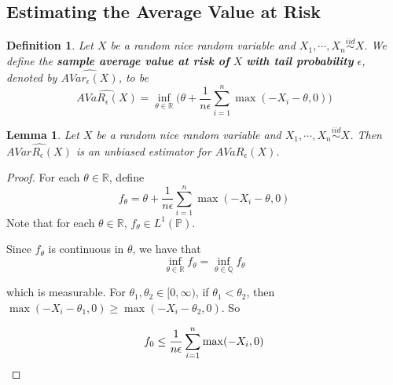 \documentclass[12pt]{amsart}
\newtheorem{lem}[thm]{Lemma}
\newtheorem{defn}[thm]{Definition}
\newcommand{\ep}{\epsilon}
\newcommand{\R}{\mathbb{R}}
\newcommand{\Q}{\mathbb{Q}}
\renewcommand{\P}{\mathbb{P}}
\newcommand{\Rg}{[0,\infty)}
\begin{document}
\subsection{Estimating the Average Value at Risk}

\begin{defn}
Let $X$ be a random nice random variable and $X_1, \cdots , X_n \stackrel{iid}{\sim} X$. We define the \textbf{sample average value at risk of }$X$ \textbf{with tail probability } $\ep$, denoted by $\widehat{AVar_{\ep}(X)}$, to be $$\widehat{AVaR_{\ep}(X)} = \inf_{\theta \in \R}\bigg(\theta + \frac{1}{n \ep} \sum_{i=1}^n\max(-X_i - \theta, 0) \bigg)$$ 
\end{defn}

\begin{lem}
Let $X$ be a random nice random variable and $X_1, \cdots , X_n \stackrel{iid}{\sim} X$. Then $\widehat{AVarR_{\ep}(X)}$ is an unbiased estimator for $AVaR_{\ep}(X)$. 
\end{lem}

\begin{proof}
For each $\theta \in \R$, define $$f_{\theta} = \theta + \frac{1}{n \ep} \sum_{i=1}^n\max(-X_i - \theta, 0) $$ Note that for each $\theta \in \R$, $f_\theta \in L^1(\P)$.  

Since $f_\theta$ is continuous in $\theta$, we have that $$\inf_{\theta \in \R} f_{\theta} = \inf_{\theta \in \Q} f_{\theta}$$ 

which is measurable. 
For $\theta_1, \theta_2 \in \Rg$, if $\theta_1 < \theta_2$, then $\max(-X_i - \theta_1, 0) \geq \max(-X_i - \theta_2, 0) $. So 

$$f_{0} \leq \frac{1}{n \ep} \sum_{i=1}^n\max(-X_i, 0)\\$$
\end{proof} 


\end{document}
